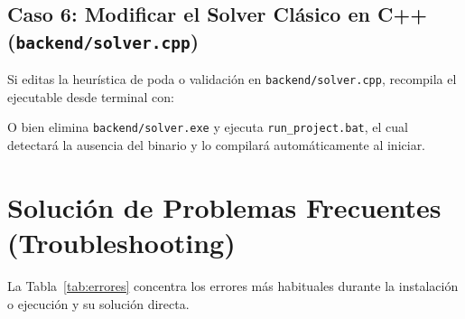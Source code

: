\documentclass[11pt,letterpaper]{article}
\newcommand{\seccionUPV}[1]{%
    \section{\texorpdfstring{\textcolor{upvmorado}{#1}}{#1}}%
    \vspace{-0.22cm}{\color{upvnaranja}\rule{\textwidth}{1.1pt}}\vspace{0.12cm}%
}
\newcommand{\subseccionUPV}[1]{%
    \subsection{\texorpdfstring{\textcolor{upvazul}{#1}}{#1}}%
}
\newcommand{\cajaCodigo}[1]{%
    \par\smallskip\noindent
    \colorbox{grisclaro}{%
        \parbox{\dimexpr\linewidth-2\fboxsep\relax}{%
            \vspace{3pt}{\ttfamily\small #1}\vspace{3pt}%
        }%
    }\par\smallskip
}
\begin{document}
\subseccionUPV{Caso 6: Modificar el Solver Clásico en C++ (\texttt{backend/solver.cpp})}

Si editas la heurística de poda o validación en \texttt{backend/solver.cpp}, recompila el ejecutable desde terminal con:
\cajaCodigo{%
g++ backend/solver.cpp -o backend/solver.exe -O2%
}
O bien elimina \texttt{backend/solver.exe} y ejecuta \texttt{run\_project.bat}, el cual detectará la ausencia del binario y lo compilará automáticamente al iniciar.

\newpage
\seccionUPV{Solución de Problemas Frecuentes (Troubleshooting)}

La Tabla~\ref{tab:errores} concentra los errores más habituales durante la instalación o ejecución y su solución directa.
\end{document}

